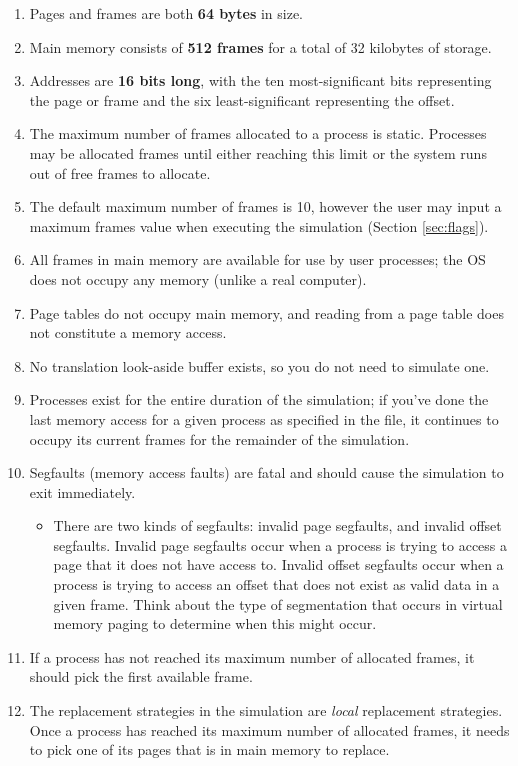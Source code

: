 \documentclass[10pt]{article}
\begin{document}
\begin{enumerate}
    \item Pages and frames are both \textbf{64 bytes} in size.
    \item Main memory consists of \textbf{512 frames} for a total of 32 kilobytes of storage.
    \item Addresses are \textbf{16 bits long}, with the ten most-significant bits representing the page or frame and the six least-significant representing the offset.
    \item The maximum number of frames allocated to a process is static. Processes may be allocated frames until either reaching this limit or the system runs out of free frames to allocate.
    \item The default maximum number of frames is 10, however the user may input a maximum frames value when executing the simulation (Section \ref{sec:flags}).
    \item All frames in main memory are available for use by user processes; the OS does not occupy any memory (unlike a real computer).
    \item Page tables do not occupy main memory, and reading from a page table does not constitute a memory access.
    \item No translation look-aside buffer exists, so you do not need to simulate one.
    \item Processes exist for the entire duration of the simulation; if you've done the last memory access for a given process as specified in the file, it continues to occupy its current frames for the remainder of the simulation.
    \item Segfaults (memory access faults) are fatal and should cause the simulation to exit immediately.
    \begin{itemize}
        \item There are two kinds of segfaults: invalid page segfaults, and invalid offset segfaults. Invalid page segfaults occur when a process is trying to access a page that it does not have access to. Invalid offset segfaults occur when a process is trying to access an offset that does not exist as valid data in a given frame. Think about the type of segmentation that occurs in virtual memory paging to determine when this might occur.
    \end{itemize}
    \item If a process has not reached its maximum number of allocated frames, it should pick the first available frame.
    \item The replacement strategies in the simulation are \textit{local} replacement strategies. Once a process has reached its maximum number of allocated frames, it needs to pick one of its pages that is in main memory to replace.
\end{enumerate}
\end{document}
